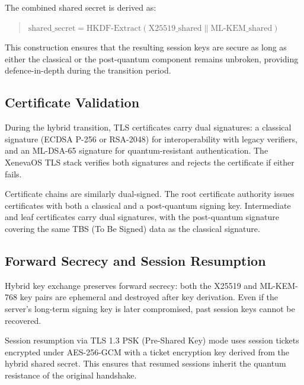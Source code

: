 \documentclass[11pt, a4paper]{article}
\begin{document}
The combined shared secret is derived as:

\begin{quote}
$\text{shared\_secret} = \text{HKDF-Extract}(\text{X25519\_shared} \| \text{ML-KEM\_shared})$
\end{quote}

This construction ensures that the resulting session keys are secure as long as either the classical or the post-quantum component remains unbroken, providing defence-in-depth during the transition period.

\subsection{Certificate Validation}\label{sec:cert-validation}

During the hybrid transition, TLS certificates carry dual signatures: a classical signature (ECDSA P-256 or RSA-2048) for interoperability with legacy verifiers, and an ML-DSA-65 signature for quantum-resistant authentication. The XenevaOS TLS stack verifies both signatures and rejects the certificate if either fails.

Certificate chains are similarly dual-signed. The root certificate authority issues certificates with both a classical and a post-quantum signing key. Intermediate and leaf certificates carry dual signatures, with the post-quantum signature covering the same TBS (To Be Signed) data as the classical signature.

\subsection{Forward Secrecy and Session Resumption}\label{sec:forward-secrecy}

Hybrid key exchange preserves forward secrecy: both the X25519 and ML-KEM-768 key pairs are ephemeral and destroyed after key derivation. Even if the server's long-term signing key is later compromised, past session keys cannot be recovered.

Session resumption via TLS 1.3 PSK (Pre-Shared Key) mode uses session tickets encrypted under AES-256-GCM with a ticket encryption key derived from the hybrid shared secret. This ensures that resumed sessions inherit the quantum resistance of the original handshake.


\end{document}
